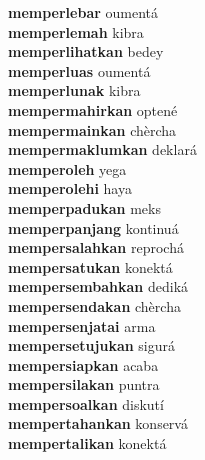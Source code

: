 \textbf{memperlebar } oumentá \\
\textbf{memperlemah } kibra \\
\textbf{memperlihatkan } bedey \\
\textbf{memperluas } oumentá \\
\textbf{memperlunak } kibra \\
\textbf{mempermahirkan } optené \\
\textbf{mempermainkan } chèrcha \\
\textbf{mempermaklumkan } deklará \\
\textbf{memperoleh } yega \\
\textbf{memperolehi } haya \\
\textbf{memperpadukan } meks \\
\textbf{memperpanjang } kontinuá \\
\textbf{mempersalahkan } reprochá \\
\textbf{mempersatukan } konektá \\
\textbf{mempersembahkan } dediká \\
\textbf{mempersendakan } chèrcha \\
\textbf{mempersenjatai } arma \\
\textbf{mempersetujukan } sigurá \\
\textbf{mempersiapkan } acaba \\
\textbf{mempersilakan } puntra \\
\textbf{mempersoalkan } diskutí \\
\textbf{mempertahankan } konservá \\
\textbf{mempertalikan } konektá \\
